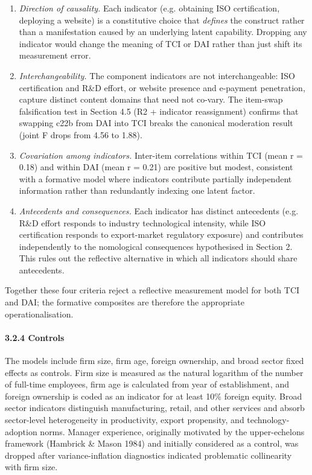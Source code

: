 \documentclass[12pt,a4paper]{article}
\providecommand{\tightlist}{\setlength{\itemsep}{0pt}\setlength{\parskip}{0pt}}
\begin{document}
\begin{enumerate}
\def\labelenumi{\arabic{enumi}.}
\tightlist
\item
  \emph{Direction of causality.} Each indicator (e.g. obtaining ISO
  certification, deploying a website) is a constitutive choice that
  \emph{defines} the construct rather than a manifestation caused by an
  underlying latent capability. Dropping any indicator would change the
  meaning of TCI or DAI rather than just shift its measurement error.
\item
  \emph{Interchangeability.} The component indicators are not
  interchangeable: ISO certification and R\&D effort, or website
  presence and e-payment penetration, capture distinct content domains
  that need not co-vary. The item-swap falsification test in Section 4.5
  (R2 + indicator reassignment) confirms that swapping c22b from DAI
  into TCI breaks the canonical moderation result (joint F drops from
  4.56 to 1.88).
\item
  \emph{Covariation among indicators.} Inter-item correlations within
  TCI (mean r = 0.18) and within DAI (mean r = 0.21) are positive but
  modest, consistent with a formative model where indicators contribute
  partially independent information rather than redundantly indexing one
  latent factor.
\item
  \emph{Antecedents and consequences.} Each indicator has distinct
  antecedents (e.g. R\&D effort responds to industry technological
  intensity, while ISO certification responds to export-market
  regulatory exposure) and contributes independently to the nomological
  consequences hypothesised in Section 2. This rules out the reflective
  alternative in which all indicators should share antecedents.
\end{enumerate}

Together these four criteria reject a reflective measurement model for
both TCI and DAI; the formative composites are therefore the appropriate
operationalisation.

\hypertarget{324-controls}{%
\paragraph{3.2.4 Controls}\label{324-controls}}

The models include firm size, firm age, foreign ownership, and broad
sector fixed effects as controls. Firm size is measured as the natural
logarithm of the number of full-time employees, firm age is calculated
from year of establishment, and foreign ownership is coded as an
indicator for at least 10\% foreign equity. Broad sector indicators
distinguish manufacturing, retail, and other services and absorb
sector-level heterogeneity in productivity, export propensity, and
technology-adoption norms. Manager experience, originally motivated by
the upper-echelons framework (Hambrick \& Mason 1984) and initially
considered as a control, was dropped after variance-inflation
diagnostics indicated problematic collinearity with firm size.
\end{document}
